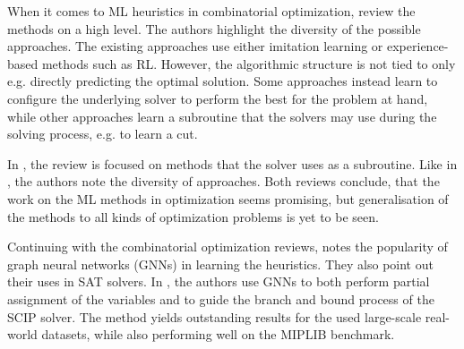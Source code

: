 \documentclass[english, 12pt, a4paper, sci, utf8, a-2b, online]{aaltothesis}
\begin{document}
When it comes to ML heuristics in combinatorial optimization, \cite{BENGIO2021405} review the methods on a high level. The authors highlight the diversity of the possible approaches. The existing approaches use either imitation learning or experience-based methods such as RL. However, the algorithmic structure is not tied to only e.g. directly predicting the optimal solution. Some approaches instead learn to configure the underlying solver to perform the best for the problem at hand, while other approaches learn a subroutine that the solvers may use during the solving process, e.g. to learn a cut. 

In \cite{ZHANG2023205}, the review is focused on methods that the solver uses as a subroutine. Like in \cite{BENGIO2021405}, the authors note the diversity of approaches. Both reviews conclude, that the work on the ML methods in optimization seems promising, but generalisation of the methods to all kinds of optimization problems is yet to be seen.

Continuing with the combinatorial optimization reviews, \cite{cappart2023combinatorial} notes the popularity of graph neural networks (GNNs) in learning the heuristics. They also point out their uses in SAT solvers. In \cite{nair2020solving}, the authors use GNNs to both perform partial assignment of the variables and to guide the branch and bound process of the SCIP solver. The method yields outstanding results for the used large-scale real-world datasets, while also performing well on the MIPLIB benchmark.



\end{document}
